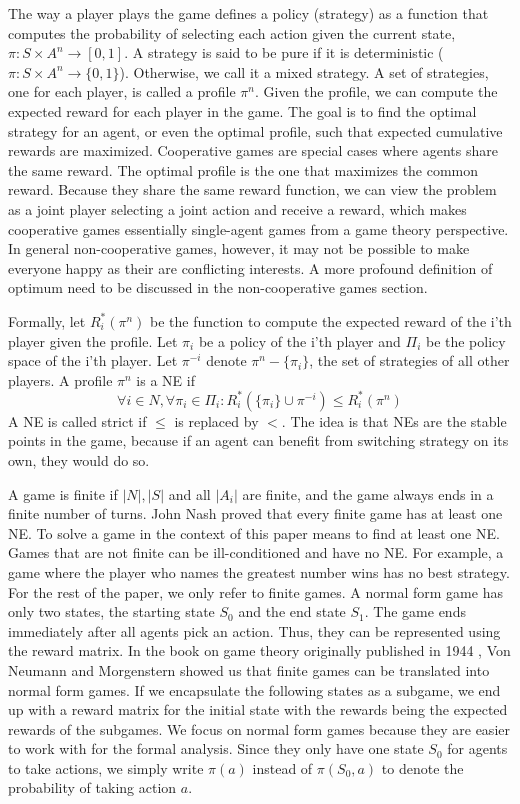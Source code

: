 \documentclass[]{interact}
\theoremstyle{plain}%
\theoremstyle{definition}
\theoremstyle{remark}
\begin{document}
The way a player plays the game defines a policy (strategy) as a function that computes the probability of selecting each action given the current state, $\pi:S \times A^n \rightarrow [0,1]$. A strategy is said to be pure if it is deterministic ($\pi:S \times A^n \rightarrow \{0,1\}$). Otherwise, we call it a mixed strategy. A set of strategies, one for each player, is called a profile $\pi^n$. Given the profile, we can compute the expected reward for each player in the game. The goal is to find the optimal strategy for an agent, or even the optimal profile, such that expected cumulative rewards are maximized. Cooperative games are special cases where agents share the same reward. The optimal profile is the one that maximizes the common reward. Because they share the same reward function, we can view the problem as a joint player selecting a joint action and receive a reward, which makes cooperative games essentially single-agent games from a game theory perspective. In general non-cooperative games, however, it may not be possible to make everyone happy as their are conflicting interests. A more profound definition of optimum need to be discussed in the non-cooperative games section.

Formally, let $R_i^*(\pi^n)$ be the function to compute the expected reward of the i'th player given the profile. Let $\pi_i$ be a policy of the i'th player and $\Pi_i$ be the policy space of the i'th player. Let $\pi^{-i}$ denote $\pi^n - \{\pi_i\}$, the set of strategies of all other players. A profile $\pi^n$ is a NE if
\begin{equation}
    \forall i \in N, \forall \pi_i \in \Pi_i: R_i^*(\{\pi_i\} \cup \pi^{-i}) \leqslant R_i^*(\pi^n)
    \label{eq:nash}
\end{equation}
A NE is called strict if $\leqslant$ is replaced by $<$. The idea is that NEs are the stable points in the game, because if an agent can benefit from switching strategy on its own, they would do so.

A game is finite if $|N|, |S|$ and all $|A_i|$ are finite, and the game always ends in a finite number of turns. John Nash proved that every finite game has at least one NE. To solve a game in the context of this paper means to find at least one NE. Games that are not finite can be ill-conditioned and have no NE. For example, a game where the player who names the greatest number wins has no best strategy. For the rest of the paper, we only refer to finite games. A normal form game has only two states, the starting state $S_0$ and the end state $S_1$. The game ends immediately after all agents pick an action. Thus, they can be represented using the reward matrix. In the book on game theory originally published in 1944 \cite{von2007theory}, Von Neumann and Morgenstern showed us that finite games can be translated into normal form games. If we encapsulate the following states as a subgame, we end up with a reward matrix for the initial state with the rewards being the expected rewards of the subgames. We focus on normal form games because they are easier to work with for the formal analysis. Since they only have one state $S_0$ for agents to take actions, we simply write $\pi(a)$ instead of $\pi(S_0, a)$ to denote the probability of taking action $a$.
\end{document}

